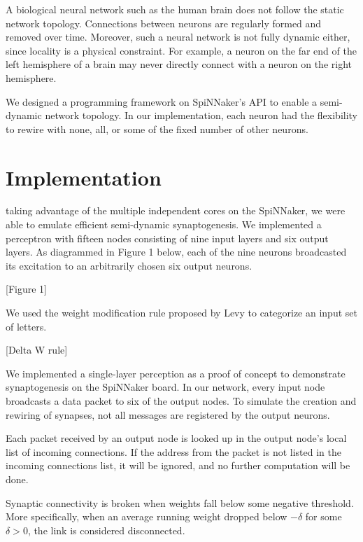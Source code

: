 \documentclass[journal]{./sty/IEEEtran}
\begin{document}
A biological neural network such as the human brain does not follow the static network topology. Connections between neurons are regularly formed and removed over time. Moreover, such a neural network is not fully dynamic either, since locality is a physical constraint. For example, a neuron on the far end of the left hemisphere of a brain may never directly connect with a neuron on the right hemisphere.

We designed a programming framework on SpiNNaker's API to enable a semi-dynamic network topology. In our implementation, each neuron had the flexibility to rewire with none, all, or some of the fixed number of other neurons.

\section{Implementation}
 taking advantage of the multiple independent cores on the SpiNNaker, we were able to emulate efficient semi-dynamic synaptogenesis. We implemented a perceptron with fifteen nodes consisting of nine input layers and six output layers. As diagrammed in Figure 1 below, each of the nine neurons broadcasted its excitation to an arbitrarily chosen six output neurons. 

\vspace{0.5cm}
[Figure 1]
\vspace{0.5cm}

We used the weight modification rule proposed by Levy to categorize an input set of letters. 

\vspace{0.5cm}
[Delta W rule]
\vspace{0.5cm}

We implemented a single-layer perception as a proof of concept to demonstrate synaptogenesis on the SpiNNaker board. In our network, every input node broadcasts a data packet to six of the output nodes. To simulate the creation and rewiring of synapses, not all messages are registered by the output neurons. 

Each packet received by an output node is looked up in the output node's local list of incoming connections. If the address from the packet is not listed in the incoming connections list, it will be ignored, and no further computation will be done.

Synaptic connectivity is broken when weights fall below some negative threshold. More specifically, when an average running weight dropped below \(-\delta\) for some \(\delta > 0\), the link is considered disconnected.
\end{document}

